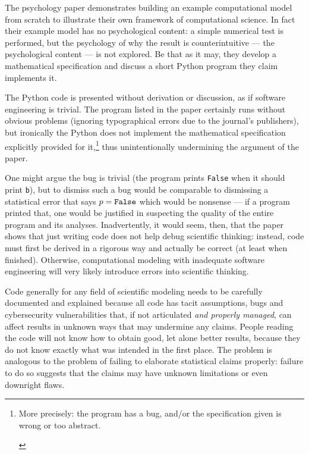 \documentclass{comjnl}
\begin{document}
\begin{change}
The psychology paper \cite{psychological-modeling} demonstrates building an example computational model from scratch to illustrate their own framework of computational science. In fact their example model has no psychological content: a simple numerical test is performed, but the psychology of why the result is counterintuitive --- the psychological content --- is not explored. Be that as it may, they develop a mathematical specification and discuss a short Python program they claim implements it. 

The Python code is presented without derivation or discussion, as if software engineering is trivial. The program listed in the paper certainly runs without obvious problems (ignoring typographical errors due to the journal's publishers), but ironically the Python does not implement the mathematical specification explicitly provided for it,\footnote{\begin{change}More precisely: the program has a bug, and/or the specification given is wrong or too abstract.\end{change}} thus unintentionally undermining the argument of the paper. 

One might argue the bug is trivial (the program prints \texttt{False} when it should print \texttt{b}), but to dismiss such a bug would be comparable to dismissing a statistical error that says $p=\mbox{\tt False}$ which would be nonsense --- if a program printed that, one would be justified in suspecting the quality of the entire program and its analyses. Inadvertently, it would seem, then, that the paper shows that just writing code does not help debug scientific thinking: instead, code must first be derived in a rigorous way and actually be correct (at least when finished). Otherwise, computational modeling with inadequate software engineering will very likely introduce errors into scientific thinking.
\end{change}

Code generally for any field of scientific modeling needs to be carefully documented and explained because all code has tacit assumptions, bugs and cybersecurity vulnerabilities \cite{Ben,nature-review,se-bias} that, if not articulated \emph{and properly managed}, can affect results in unknown ways that may undermine any claims. People reading the code will not know how to obtain good, let alone better results, because they do not know exactly what was intended in the first place. The problem is analogous to the problem of failing to elaborate statistical claims properly: failure to do so suggests that the claims may have unknown limitations or even downright flaws.
\end{document}
